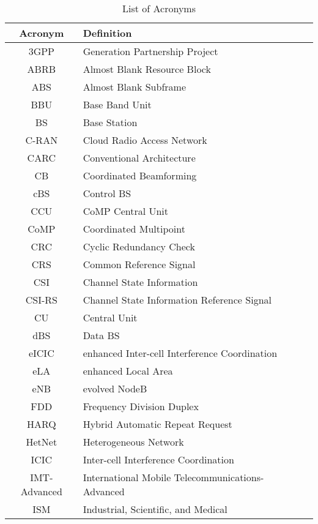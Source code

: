 \documentclass[article,10pt,twocolumn]{IEEEtran}
\begin{document}
\begin{table}[t]
\renewcommand{\arraystretch}{1.35}
    \centering
    \caption{List of Acronyms}\label{Table:tabnom}
    \vspace{2mm}
    \begin{tabular}{c||lc}
    	\hline
    	\textbf{Acronym}	&	\textbf{Definition}\\
    	\hline
    	3GPP	&	 Generation Partnership Project\\
    	\hline
     	ABRB	&	Almost Blank Resource Block\\
    	\hline
	ABS	&	Almost Blank Subframe\\
    	\hline
	BBU	&	Base Band Unit\\
    	\hline
	BS	&	Base Station\\
    	\hline
	C-RAN&	Cloud Radio Access Network\\
    	\hline
	CARC	&	Conventional Architecture\\
    	\hline
	CB	&	Coordinated Beamforming\\
    	\hline
	cBS	&	Control BS\\
    	\hline
	CCU	&	CoMP Central Unit\\
    	\hline
	CoMP	&	Coordinated Multipoint\\
    	\hline
	CRC	&	Cyclic Redundancy Check\\
    	\hline
	CRS	&	Common Reference Signal\\
    	\hline
	CSI	&	Channel State Information\\
    	\hline
	CSI-RS&	Channel State Information Reference Signal\\
    	\hline
	CU	&	Central Unit\\
    	\hline
	dBS	&	Data BS\\
    	\hline
	eICIC	&	enhanced Inter-cell Interference Coordination\\
    	\hline
	eLA	&	enhanced Local Area\\
    	\hline
	eNB	&	evolved NodeB\\
    	\hline
	FDD	&	Frequency Division Duplex\\
    	\hline
	HARQ	&	Hybrid Automatic Repeat Request\\
    	\hline
	HetNet&	Heterogeneous Network\\
	\hline
	ICIC	&	Inter-cell Interference Coordination\\
    	\hline
	IMT-Advanced	&	International Mobile Telecommunications-Advanced\\
    	\hline
	ISM	&	Industrial, Scientific, and Medical\\

\end{tabular}
\end{table}
\end{document}
